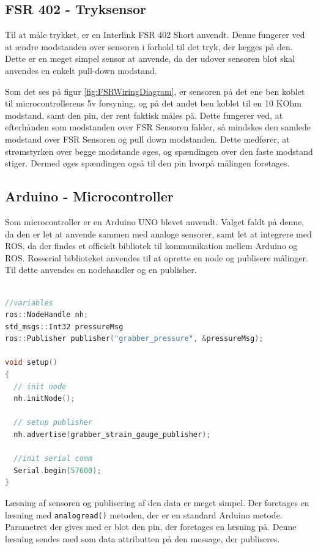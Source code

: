 \subsection{FSR 402 - Tryksensor}
Til at måle trykket, er en Interlink FSR 402 Short anvendt. Denne fungerer ved at ændre modstanden over sensoren i forhold til det tryk, der lægges på den. Dette er en meget simpel sensor at anvende, da der udover sensoren blot skal anvendes en enkelt pull-down modstand. 


Som det ses på figur \ref{fig:FSRWiringDiagram}, er sensoren på det ene ben koblet til microcontrollerens 5v forsyning, og på det andet ben koblet til en 10 KOhm modstand, samt den pin, der rent faktisk måles på. Dette fungerer ved, at efterhånden som modstanden over FSR Sensoren falder, så mindskes den samlede modstand over FSR Sensoren og pull down modstanden. Dette medfører, at strømstyrken over begge modstande øges, og spændingen over den faste modstand stiger. Dermed øges spændingen også til den pin hvorpå målingen foretages. 

\subsection{Arduino - Microcontroller}
Som microcontroller er en Arduino UNO blevet anvendt. Valget faldt på denne, da den er let at anvende sammen med analoge sensorer, samt let at integrere med ROS, da der findes et officielt bibliotek til kommunikation mellem Arduino og ROS. 
Rosserial biblioteket anvendes til at oprette en node og publisere målinger. Til dette anvendes en nodehandler og en publisher. 

\begin{lstlisting}[language=C]

//variables
ros::NodeHandle nh;
std_msgs::Int32 pressureMsg
ros::Publisher publisher("grabber_pressure", &pressureMsg);

void setup()
{
  // init node
  nh.initNode();

  // setup publisher
  nh.advertise(grabber_strain_gauge_publisher);
  
  //init serial comm
  Serial.begin(57600);
}

\end{lstlisting}

Læsning af sensoren og publisering af den data er meget simpel. Der foretages en læsning med \texttt{analogread()} metoden, der er en standard Arduino metode. Parametret der gives med er blot den pin, der foretages en læsning på. 
Denne læsning sendes med som data attributten på den message, der publiseres. 


